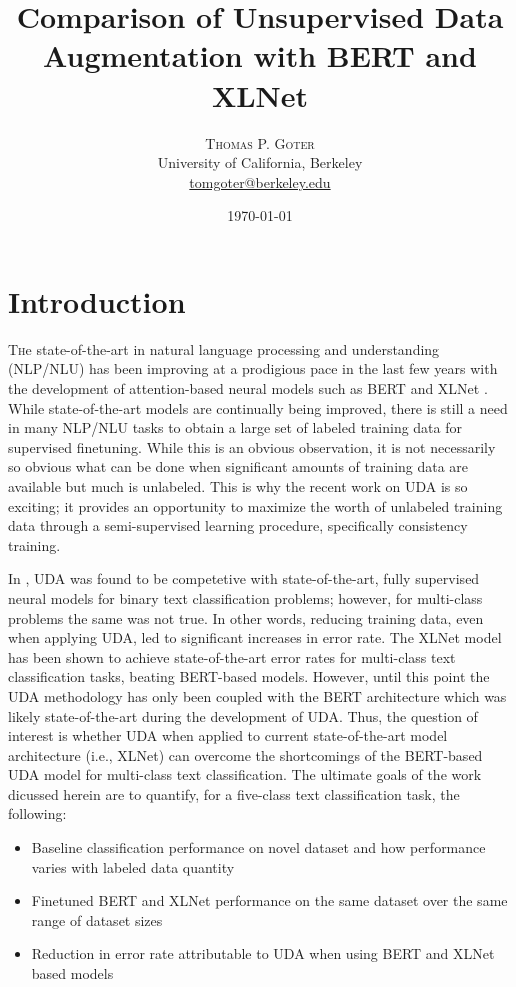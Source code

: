 \documentclass[twoside,twocolumn,10pt]{article}
\title{Comparison of Unsupervised Data Augmentation with BERT and XLNet} %
\author{%
\textsc{Thomas P. Goter} \\[1ex] %
\normalsize University of California, Berkeley \\ %
\normalsize \href{mailto:tomgoter@berkeley.edu}{tomgoter@berkeley.edu} %
}
\date{\today} %
\begin{document}
\maketitle


\section{Introduction} \label{introduction}

\lettrine[nindent=0em,lines=3]{T} he state-of-the-art in natural language processing and understanding (NLP/NLU) has been improving at a prodigious pace in the last few years with the development of attention-based neural models \cite{Vaswani:2017} such as BERT \cite{Devlin:2019} and XLNet \cite{Yang:2019}.  While state-of-the-art models are continually being improved, there is still a need in many NLP/NLU tasks to obtain a large set of labeled training data for supervised finetuning.  While this is an obvious observation, it is not necessarily so obvious what can be done when significant amounts of training data are available but much is unlabeled.  This is why the recent work on UDA \cite{Xie:2019} is so exciting; it provides an opportunity to maximize the worth of unlabeled training data through a semi-supervised learning procedure, specifically consistency training.

In \cite{Xie:2019}, UDA was found to be competetive with state-of-the-art, fully supervised neural models for binary text classification problems; however, for multi-class problems the same was not true.  In other words, reducing training data, even when applying UDA, led to significant increases in error rate. The XLNet model \cite{Yang:2019} has been shown to achieve state-of-the-art error rates for multi-class text classification tasks, beating BERT-based models.  However, until this point the UDA methodology has only been coupled with the BERT architecture which was likely state-of-the-art during the development of UDA. Thus, the question of interest is whether UDA when applied to current state-of-the-art model architecture (i.e., XLNet) can
overcome the shortcomings of the BERT-based UDA model for multi-class text classification. The ultimate goals of the work dicussed herein are to quantify, for a five-class text classification task, the following:
\begin{itemize}
	\item Baseline classification performance on novel dataset and how performance varies with labeled data quantity
	\item Finetuned BERT and XLNet performance on the same dataset over the same range of dataset sizes
	\item Reduction in error rate attributable to UDA when using BERT and XLNet based models
\end{itemize}
\end{document}
